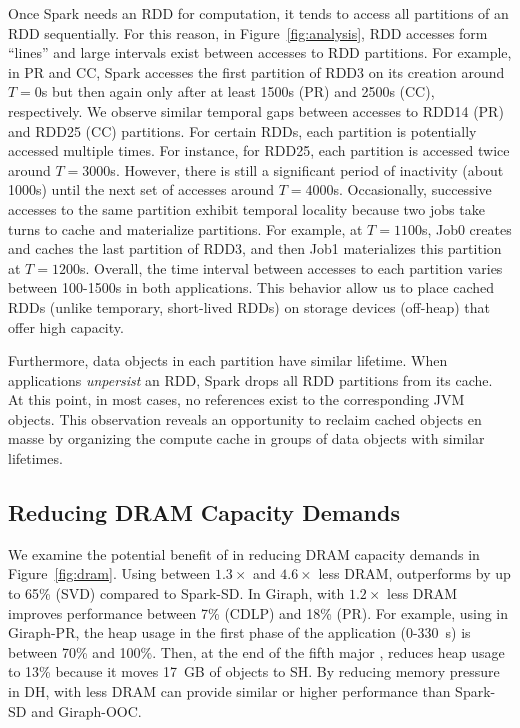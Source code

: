 Once Spark needs an RDD for computation, it tends to access all
partitions of an RDD sequentially. For this reason, in
Figure~\ref{fig:analysis}, RDD accesses form ``lines'' and large
intervals exist between accesses to RDD partitions. For example, in PR
and CC, Spark accesses the first partition of RDD3 on its creation
around $T = 0$\:s but then again only after at least 1500\:s (PR) and
2500\:s (CC), respectively. We observe similar temporal gaps between
accesses to RDD14 (PR) and RDD25 (CC) partitions. For certain RDDs,
each partition is potentially accessed multiple times. For instance,
for RDD25, each partition is accessed twice around $T = 3000$\:s.
However, there is still a significant period of inactivity (about
1000\:s) until the next set of accesses around $T = 4000$\:s.
Occasionally, successive accesses to the same partition exhibit
temporal locality because two jobs take turns to cache and materialize
partitions. For example, at $T = 1100$\:s, Job0 creates and caches the
last partition of RDD3, and then Job1 materializes this partition at
$T = 1200$\:s. Overall, the time interval between accesses to each
partition varies between 100-1500\:s in both applications. This
behavior allow us to place cached RDDs (unlike temporary, short-lived
RDDs) on storage devices (off-heap) that offer high capacity.

Furthermore, data objects in each partition have similar lifetime.
When applications \emph{unpersist} an RDD, Spark drops all RDD
partitions from its cache. At this point, in most cases, no references
exist to the corresponding JVM objects. This observation reveals an
opportunity to reclaim cached objects en masse by organizing the
compute cache in groups of data objects with similar lifetimes.

\subsection{\textbf{Reducing DRAM Capacity Demands}}
We examine the potential benefit of \teraheapName{} in reducing DRAM capacity
demands in Figure~\ref{fig:dram}. Using between $1.3\times$ and
$4.6\times$ less DRAM, \teraheapName{} outperforms by up to 65\% (SVD) compared
to Spark-SD. In Giraph, \teraheapName{} with $1.2\times$ less DRAM improves
performance between 7\% (CDLP) and 18\% (PR). For example, using
\teraheapName{} in Giraph-PR, the heap usage in the first phase of the
application (0-\SI{330}{s}) is between 70\% and 100\%. Then, at the end of
the fifth major \teraheapGC, \teraheapName{} reduces heap usage to 13\% because it
moves \SI{17}{GB} of objects to SH. By reducing memory pressure in DH,
\teraheapName{} with less DRAM can provide similar or higher performance than
Spark-SD and Giraph-OOC.

